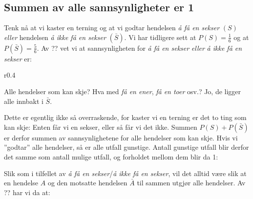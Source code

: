 \subsection{Summen av alle sannsynligheter er 1}
Tenk nå at vi kaster en terning og at vi godtar hendelsen \textit{å få en sekser} $ (S) $ \textsl{eller} hendelsen \textit{å ikke få en sekser} $ (\bar{S}) $. Vi har tidligere sett at $ {P(S)=\frac{1}{6}} $ og at $ {P(\bar{S})=\frac{5}{6} }$. Av ?? vet vi at sannsynligheten for \textit{å få en sekser} \textsl{eller} \textit{å ikke få en sekser} er:
\begin{wrapfigure}[6]{r}{0.4\linewidth}
	\vs\vs
	\begin{shaded}
		Alle hendelser som kan skje? Hva med \textit{få en ener}, \textit{få en toer} osv.? Jo, de ligger alle innbakt i $ \bar{S} $.
	\end{shaded}
\end{wrapfigure}
Dette er egentlig ikke så overraskende, for kaster vi en terning er det to ting som kan skje: Enten får vi en sekser, eller så får vi det ikke. Summen $ P(S)+P(\bar{S}) $ er derfor summen av sannsynlighetene for alle hendelser som kan skje. Hvis vi ''godtar'' alle hendelser, så er alle utfall gunstige. Antall gunstige utfall blir derfor det samme som antall mulige utfall, og forholdet mellom dem blir da 1: 

Slik som i tilfellet av \textit{å få en sekser}/\textit{å ikke få en sekser}, vil det alltid være slik at en hendelse $ A $ og den motsatte hendelsen $ \bar A $ til sammen utgjør alle hendelser. Av ?? har vi da at:
